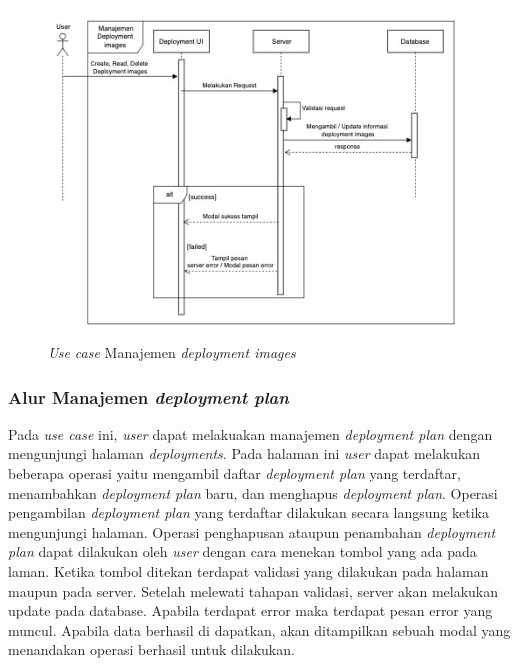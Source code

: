 \begin{figure}[h]
  \centering
  \includegraphics[width=1\textwidth]{resources/chapter-3/usecase/uc-10.jpg}
  \caption{\textit{Use case} Manajemen \textit{deployment images}}
  \label{fig:usecase-10}
\end{figure}

\pagebreak

\subsubsection{Alur Manajemen \textit{deployment plan}}

Pada \textit{use case} ini, \textit{user} dapat melakuakan manajemen \textit{deployment plan} dengan mengunjungi halaman \textit{deployments}. Pada halaman ini \textit{user} dapat melakukan beberapa operasi yaitu mengambil daftar \textit{deployment plan} yang terdaftar, menambahkan \textit{deployment plan} baru, dan menghapus \textit{deployment plan}. Operasi pengambilan \textit{deployment plan} yang terdaftar dilakukan secara langsung ketika mengunjungi halaman. Operasi penghapusan ataupun penambahan \textit{deployment plan} dapat dilakukan oleh \textit{user} dengan cara menekan tombol yang ada pada laman. Ketika tombol ditekan terdapat validasi yang dilakukan pada halaman maupun pada server. Setelah melewati tahapan validasi, server akan melakukan update pada database. Apabila terdapat error maka terdapat pesan error yang muncul. Apabila data berhasil di dapatkan, akan ditampilkan sebuah modal yang menandakan operasi berhasil untuk dilakukan.

